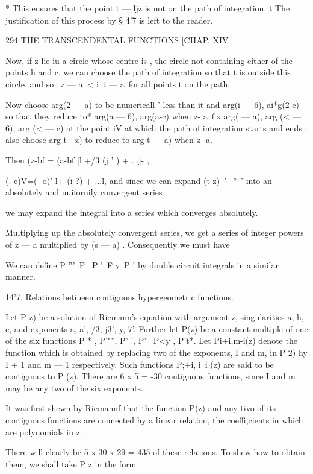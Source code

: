 * This ensures that the point t — ljz is not on the path of
integration, t The justification of this process by § 4'7 is left to
the reader.



294 THE TRANSCENDENTAL FUNCTIONS [CHAP. XIV

Now, if z lie iu a circle whose centre is , the circle not containing
either of the points h and c, we can choose the path of integration so
that t is outside this circle, and so \ z — a\ < i\ t — a\ for all
points t on the path.

Now choose arg(2 — a) to be numericall ' less than it and arg(i — 6),
ai*g(2-c) so that they reduce to* arg(a — 6), arg(a-c) when z- a\ fix
arg( — a), arg (< — 6), arg (< — c) at the point iV at which the path
of integration starts and ends ; also choose arg t - z) to reduce to
arg t — a) when z- a.

Then (z-bf = (a-bf |l +/3 (j ' ) + ...j- ,

(.-c)V=( -o)' l+ (i ?) + ...l, and since we can expand (t-z)~' ~°~'
into an absolutely and uuifornily convergent series

we may expand the integral into a series which converges absolutely.

Multiplying up the absolutely convergent series, we get a series of
integer powers of z — a multiplied by (s — a) . Consequently we must
have

We can define P '''\ P \ P '\ F y\ P ' by double circuit integrals in
a similar manner.

14'7. Relations hetiueen contiguous hypergeometric functions.

Let P z) be a solution of Riemann's equation with argument z,
singularities a, h, c, and exponents a, a', /3, j3', y, 7'. Further
let P(z) be a constant multiple of one of the six functions P * ,
P'"'', P' ', P' \ P<y , P't*. Let Pi+i,m-i(z) denote the function
which is obtained by replacing two of the exponents, I and m, in P 2)
hy I + 1 and m — 1 respectively. Such functions P;+i, i\ i (z) are
said to be contiguous to P (z). There are 6 x 5 = -30 contiguous
functions, since I and m may be any two of the six exponents.

It was first shewn by Riemannf that the function P(z) and any tivo of
its contiguous functions are connected hy a linear relation, the
coeffi,cients in which are polynomials in z.

There will clearly be 5 x 30 x 29 = 435 of these relations. To shew
how to obtain them, we shall take P z in the form

